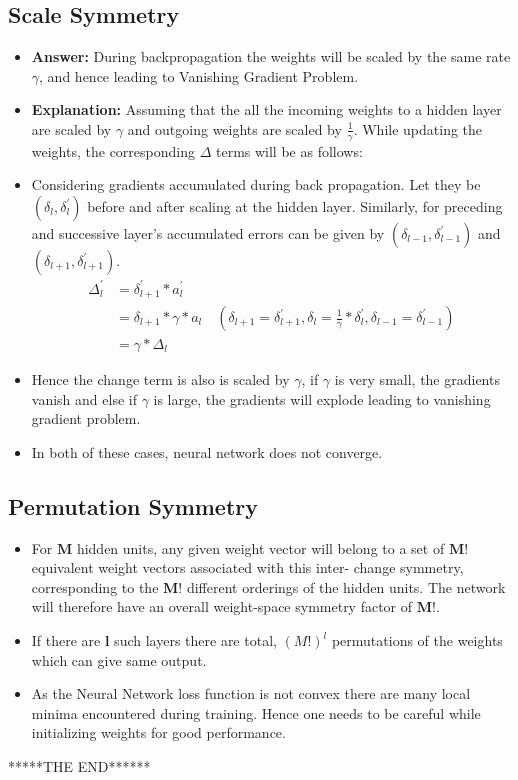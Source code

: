 \documentclass[english,a4paper,12pt]{article}
\begin{document}
\subsection{Scale Symmetry}
\begin{itemize}
    \item \textbf{Answer:} During backpropagation the weights will be scaled by the same rate $\gamma$, and hence leading to Vanishing Gradient Problem.
    \item \textbf{Explanation:} Assuming that the all the incoming weights to a hidden layer are scaled by $\gamma$ and outgoing weights are scaled by $\frac{1}{\gamma}$. While updating the weights, the corresponding $\Delta$ terms will be as follows:
    \item Considering gradients accumulated during back propagation. Let they be $(\delta_{l},\delta_{l}^{'})$ before and after scaling at the hidden layer. Similarly, for preceding and successive layer's accumulated errors can be given by $(\delta_{l-1},\delta_{l-1}^{'})$ and $(\delta_{l+1},\delta_{l+1}^{'})$.
                \begin{equation*}
                    \begin{split}
                        \Delta_{l}^{'} & = \delta_{l+1}^{'} * a_{l}^{'} \\
                        & = \delta_{l+1} * \gamma * a_{l} \quad  \left( \delta_{l+1}= \delta_{l+1}^{'} ,  \delta_{l} = \frac{1}{\gamma} * \delta_{l}^{'} , \delta_{l-1} = \delta_{l-1}^{'} \right) \\
                        & = \gamma * \Delta_{l}
                    \end{split}
                \end{equation*}
    \item Hence the change term is also is scaled by $\gamma$, if $\gamma$ is very small, the gradients vanish and else if $\gamma$ is large, the gradients will explode leading to vanishing gradient problem.
    \item In both of these cases, neural network does not converge.
\end{itemize}

\subsection{Permutation Symmetry}

\begin{itemize}
    \item For $\mathbf{M}$ hidden units, any given weight
vector will belong to a set of $\mathbf{M!}$ equivalent weight vectors associated with this inter-
change symmetry, corresponding to the $\mathbf{M!}$ different orderings of the hidden units.
The network will therefore have an overall weight-space symmetry factor of $\mathbf{M!}$.
\item If there are $\mathbf{l}$ such layers there are total, ${(M!)}^l$ permutations of the weights which can give same output.
\item As the Neural Network loss function is not convex there are many local minima encountered during training. Hence one needs to be careful while initializing weights for good performance.
\end{itemize}


\center ******THE END******
\newpage
\end{document}
